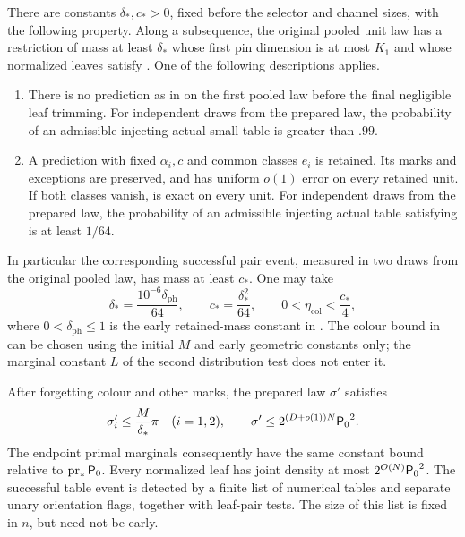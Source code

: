 \begin{proposition}
\label{prop:status-preparation}
There are constants \(\delta_*,c_*>0\), fixed before the selector
and channel sizes, with the following property.  Along a subsequence,
the original pooled unit law has a restriction of mass at least
\(\delta_*\) whose first pin dimension is at most \(K_1\) and whose
normalized leaves satisfy .  One of
the following descriptions applies.
\begin{enumerate}[label=\textup{(\roman*)}]
\item There is no prediction as in  on the
first pooled law before the final negligible leaf trimming.  For
independent draws from the prepared law, the probability of an
admissible injecting actual small table is greater than \(.99\).
\item A prediction with fixed \(\alpha_i,c\) and common classes
\(e_i\) is retained.  Its marks and exceptions are preserved, and
 has uniform \(o(1)\) error on every retained
unit.  If both classes vanish,  is exact
on every unit.  For independent draws from the prepared law,
the probability of an admissible injecting actual table satisfying
 is at least \(1/64\).
\end{enumerate}
In particular the corresponding successful pair event, measured
in two draws from the original pooled law, has mass at least
\(c_*\).  One may take
\begin{equation}
 \delta_* = \frac{10^{-6}\delta_{\mathrm{ph}}}{64},
 \qquad c_* = \frac{\delta_*^2}{64},
 \qquad 0<\eta_{\mathrm{col}}<\frac{c_*}{4},
 \label{eq:preparation-early-margins}
\end{equation}
where \(0<\delta_{\mathrm{ph}}\le1\) is the early retained-mass
constant in .  The colour bound in
 can be chosen using the initial
\(M\) and early geometric constants only; the marginal constant
\(L\) of the second distribution test does not enter it.

After forgetting colour and other marks, the prepared law
\(\sigma'\) satisfies
\begin{equation}
 \sigma'_i\le\frac{M}{\delta_*}\pi\quad(i=1,2),
 \qquad
 \sigma'\le 2^{(D+o(1))N}{\mathsf P_0}^2.
 \label{eq:prepared-marginals}
\end{equation}
The endpoint primal marginals consequently have the same constant
bound relative to \(\operatorname{pr}_*{\mathsf P_0}\).  Every normalized
leaf has joint density at most \(2^{O(N)}{\mathsf P_0}^2\).  The successful
table event is detected by a finite list of numerical tables and
separate unary orientation flags, together with leaf-pair tests.
The size of this list is fixed in \(n\), but need not be early.
\end{proposition}

